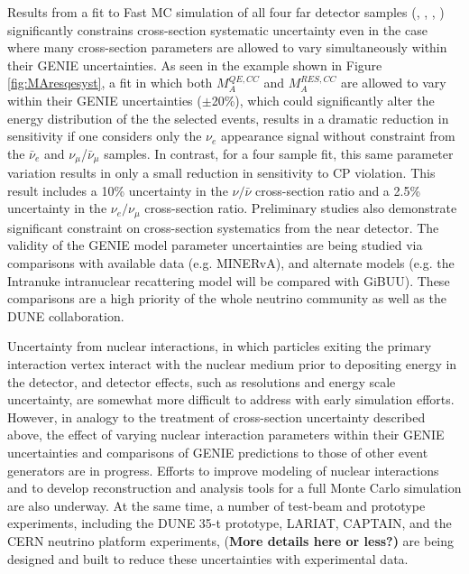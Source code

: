 Results from a fit to Fast MC simulation of all four far detector samples
(\nue, \anue, \numu, \anumu) significantly
constrains cross-section systematic uncertainty even in the case where many
cross-section parameters are allowed to vary simultaneously within their
GENIE uncertainties. As seen in the example shown in Figure
\ref{fig:MAresqesyst}, 
a fit in which both $M_A^{QE,CC}$ and 
$M_A^{RES,CC}$ are allowed to vary within their GENIE uncertainties 
($\pm$20\%), which could significantly alter the energy distribution of the 
the selected events, results in a dramatic reduction in sensitivity if one 
considers only the $\nu_e$ appearance signal without constraint from the 
$\bar{\nu}_e$ and $\nu_{\mu}$/$\bar{\nu}_{\mu}$ samples.
In contrast, for a four sample fit,
this same parameter variation results in only a small reduction in
sensitivity to CP violation.
This result includes a 10\% uncertainty in the $\nu/\bar{\nu}$
cross-section ratio and a 2.5\% uncertainty in the $\nu_e/\nu_{\mu}$
cross-section ratio.
Preliminary studies also
demonstrate significant constraint on cross-section systematics from the 
near detector. The validity of the GENIE model parameter uncertainties are being studied 
via comparisons with available data (e.g. MINERvA), and alternate models (e.g. the 
Intranuke intranuclear recattering model will be compared with GiBUU). These comparisons 
are a high priority of the whole neutrino community as well as the DUNE collaboration.

Uncertainty from nuclear interactions, in which particles exiting the primary
interaction vertex interact with the nuclear medium prior to depositing energy
in the detector, and detector effects, such as resolutions and energy scale
uncertainty, are somewhat more difficult to address with early simulation efforts.
However, in analogy to the treatment of cross-section uncertainty described above,
the effect of varying nuclear interaction parameters within their GENIE
uncertainties and comparisons of GENIE predictions to those of other
event generators are in progress.
Efforts to improve modeling of nuclear interactions and to develop 
reconstruction and analysis tools for a full Monte Carlo simulation are also underway. 
At the same time,
a number of test-beam and prototype experiments, including the DUNE 35-t prototype,
LARIAT, CAPTAIN, and the CERN neutrino platform experiments, 
{(\bf More details here or less?)} are being designed and built to reduce these
uncertainties with experimental data.

